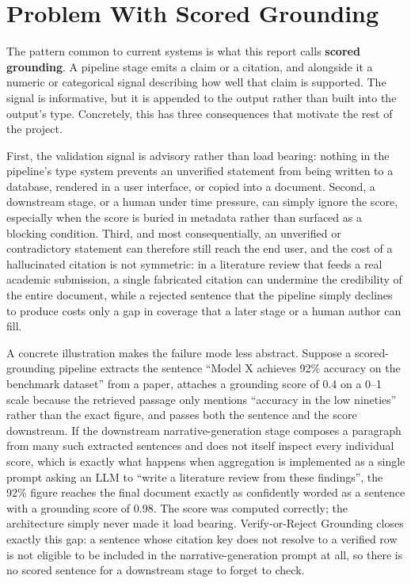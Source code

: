 \documentclass[12pt,a4paper]{report}
\begin{document}
\section{Problem With Scored Grounding}
The pattern common to current systems is what this report calls
\textbf{scored grounding}. A pipeline stage emits a claim or a citation, and
alongside it a numeric or categorical signal describing how well that claim is
supported. The signal is informative, but it is appended to the output rather
than built into the output's type. Concretely, this has three consequences that
motivate the rest of the project.

First, the validation signal is advisory rather than load bearing: nothing in
the pipeline's type system prevents an unverified statement from being written
to a database, rendered in a user interface, or copied into a document. Second,
a downstream stage, or a human under time pressure, can simply ignore the
score, especially when the score is buried in metadata rather than surfaced as
a blocking condition. Third, and most consequentially, an unverified or
contradictory statement can therefore still reach the end user, and the cost of
a hallucinated citation is not symmetric: in a literature review that feeds a
real academic submission, a single fabricated citation can undermine the
credibility of the entire document, while a rejected sentence that the pipeline
simply declines to produce costs only a gap in coverage that a later stage or a
human author can fill.

A concrete illustration makes the failure mode less abstract. Suppose a
scored-grounding pipeline extracts the sentence ``Model X achieves 92\%
accuracy on the benchmark dataset'' from a paper, attaches a grounding score of
0.4 on a 0--1 scale because the retrieved passage only mentions ``accuracy in
the low nineties'' rather than the exact figure, and passes both the sentence
and the score downstream. If the downstream narrative-generation stage
composes a paragraph from many such extracted sentences and does not itself
inspect every individual score, which is exactly what happens when
aggregation is implemented as a single prompt asking an LLM to ``write a
literature review from these findings'', the 92\% figure reaches the final
document exactly as confidently worded as a sentence with a grounding score of
0.98. The score was computed correctly; the architecture simply never made it
load bearing. Verify-or-Reject Grounding closes exactly this gap: a sentence
whose citation key does not resolve to a verified row is not eligible to be
included in the narrative-generation prompt at all, so there is no scored
sentence for a downstream stage to forget to check.
\end{document}
